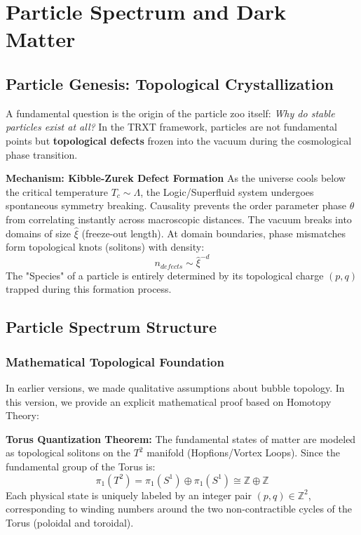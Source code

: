 \documentclass[a4paper,12pt]{article}
\begin{document}
\section{Particle Spectrum and Dark Matter}

\subsection{Particle Genesis: Topological Crystallization}

A fundamental question is the origin of the particle zoo itself: \emph{Why do stable particles exist at all?}
In the TRXT framework, particles are not fundamental points but \textbf{topological defects} frozen into the vacuum during the cosmological phase transition.

\textbf{Mechanism: Kibble-Zurek Defect Formation}
As the universe cools below the critical temperature $T_c \sim \Lambda$, the Logic/Superfluid system undergoes spontaneous symmetry breaking. Causality prevents the order parameter phase $\theta$ from correlating instantly across macroscopic distances. The vacuum breaks into domains of size $\hat{\xi}$ (freeze-out length).
At domain boundaries, phase mismatches form topological knots (solitons) with density:
\begin{equation}
n_{defects} \sim \hat{\xi}^{-d}
\end{equation}
The "Species" of a particle is entirely determined by its topological charge $(p,q)$ trapped during this formation process.

\subsection{Particle Spectrum Structure}

\subsubsection{Mathematical Topological Foundation}
In earlier versions, we made qualitative assumptions about bubble topology. In this version, we provide an explicit mathematical proof based on Homotopy Theory:

\textbf{Torus Quantization Theorem:}
The fundamental states of matter are modeled as topological solitons on the $T^2$ manifold (Hopfions/Vortex Loops). Since the fundamental group of the Torus is:
\begin{equation}
 \pi_1(T^2) = \pi_1(S^1) \oplus \pi_1(S^1) \cong \mathbb{Z} \oplus \mathbb{Z}
\end{equation}
Each physical state is uniquely labeled by an integer pair $(p,q) \in \mathbb{Z}^2$, corresponding to winding numbers around the two non-contractible cycles of the Torus (poloidal and toroidal).
\end{document}
